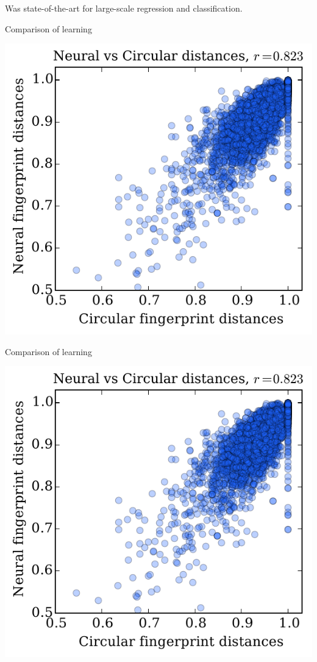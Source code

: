 \documentclass[landscape,a0b,final,a4resizeable]{include/a0poster}
\begin{document}
\begin{poster}
\begin{multicols}{3}
\vspace{0.5in}

Was state-of-the-art for large-scale regression and classification.



\newpage %



Comparison of learning

\vspace{0.5em}

\begin{center}
\includegraphics[width=.5\columnwidth]{figures/fig_2.pdf}
\end{center}

\vspace{0.5em}


Comparison of learning

\vspace{0.5em}

\begin{center}
\includegraphics[width=.5\columnwidth]{figures/fig_2.pdf}
\end{center}


\end{multicols}
\end{poster}
\end{document}
